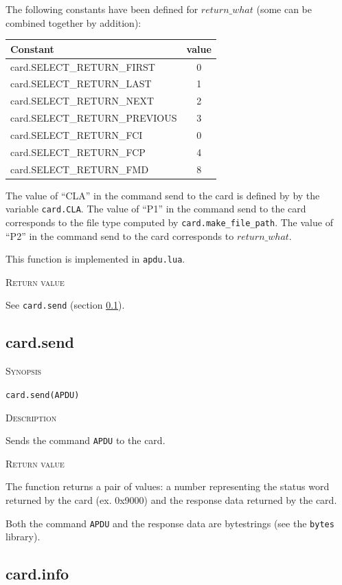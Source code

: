 \documentclass[11pt]{report}
\newcommand{\mansection}[1]{\vspace{0.5em}\par\noindent\textsc{#1}\vspace{0.5em}\par}
\begin{document}
  The following constants have been defined for $return\_what$ (some can be combined together by addition):

  \begin{table}[!hbp]
  \begin{tabular}{|l|c|}
  \hline
  Constant & value \\
  \hline
  card.SELECT\_RETURN\_FIRST      & 0 \\
  card.SELECT\_RETURN\_LAST       & 1 \\
  card.SELECT\_RETURN\_NEXT       & 2 \\
  card.SELECT\_RETURN\_PREVIOUS   & 3 \\
  card.SELECT\_RETURN\_FCI        & 0 \\
  card.SELECT\_RETURN\_FCP        & 4 \\
  card.SELECT\_RETURN\_FMD        & 8 \\
  \hline
  \end{tabular}
  \end{table}

  The value of ``CLA'' in the command send to the card is defined by by the variable \texttt{card.CLA}.
  The value of ``P1'' in the command send to the card corresponds to the file type computed by \texttt{card.make\_file\_path}.
  The value of ``P2'' in the command send to the card corresponds to $return\_what$.

  This function is implemented in \texttt{apdu.lua}.

\mansection{Return value}
  See \texttt{card.send} (section \ref{sec:card_send}).


\subsection{card.send}
\label{sec:card_send}

\mansection{Synopsis}
\texttt{card.send(APDU)}

\mansection{Description}
  Sends the command \texttt{APDU} to the card. 

\mansection{Return value}
  The function returns a pair of values: a number representing the status word 
  returned by the card (ex. 0x9000) and the response data returned by the card.
  
  Both the command \texttt{APDU} and the response data are bytestrings 
  (see the \texttt{bytes} library).


\subsection{card.info}
\end{document}

